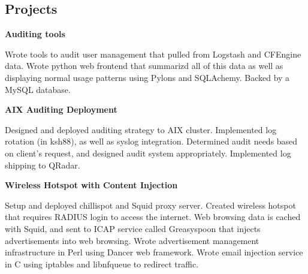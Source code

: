 \documentclass[letter,margin,line]{resume}
\begin{document}
\begin{resume}
\section{\mysidestyle Projects}
	\begin{asparablank}
		\item {\bf Auditing tools}
		
		\small Wrote tools to audit user management that pulled from Logstash and CFEngine data. Wrote
		python web frontend that summarizd all of this data as well as displaying normal usage patterns
		using Pylons and SQLAchemy. Backed by a MySQL database.
		\normalsize
		\\
		
		\item {\bf AIX Auditing Deployment}
		
		\small Designed and deployed auditing strategy to AIX cluster.
		Implemented log rotation (in ksh88), as well as syslog
		integration. Determined audit needs based on client's request,
		and designed audit system appropriately. Implemented log
		shipping to QRadar.
		\normalsize
		\\
		
		\item {\bf Wireless Hotspot with Content Injection}
		
		\small Setup and deployed chillispot and Squid proxy server.
        Created wireless hotspot that requires RADIUS login to access the
        internet. Web browsing data is cached with Squid, and sent to ICAP
        service called Greasyspoon that injects advertisements into web
        browsing. Wrote advertisement management infrastructure in Perl using
        Dancer web framework. Wrote email injection service in C using iptables
        and libnfqueue to redirect traffic.
		\normalsize
		\\
	\end{asparablank}	
\end{resume}
\end{document}
